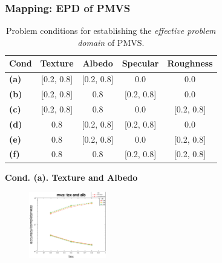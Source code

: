 \documentclass{beamer}
\begin{document}
\begin{frame}
\frametitle{Mapping: EPD of PMVS}

\begin{table}[!htbp]
  \centering
  \caption{Problem conditions for establishing the \textit{effective problem domain} of PMVS.}
  \begin{tabular}{l*{4}{c}}
  \hline
  \textbf{Cond} & Texture & Albedo & Specular & Roughness\\
  \hline
  \textbf{(a)} & [0.2, 0.8] & [0.2, 0.8] & 0.0 & 0.0\\
  \textbf{(b)} & [0.2, 0.8] & 0.8 & [0.2, 0.8] & 0.0\\
  \textbf{(c)} & [0.2, 0.8] & 0.8 & 0.0 & [0.2, 0.8]\\
  \textbf{(d)} & 0.8 & [0.2, 0.8] & [0.2, 0.8] & 0.0\\
  \textbf{(e)} & 0.8 & [0.2, 0.8] & 0.0 & [0.2, 0.8]\\
  \textbf{(f)} & 0.8 & 0.8 & [0.2, 0.8] & [0.2, 0.8]\\
  \hline
  \end{tabular}
\end{table}

\textbf{Cond. (a). Texture and Albedo}
\begin{figure}[!htbp]
\includegraphics[width=0.3\textwidth]{mapping/depend_check/mvs_tex_alb}
\end{figure}

\end{frame}
\end{document}

